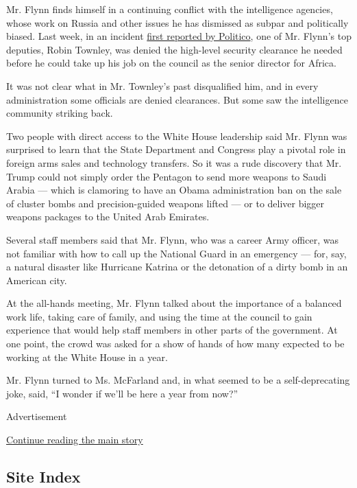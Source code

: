 Mr. Flynn finds himself in a continuing conflict with the intelligence
agencies, whose work on Russia and other issues he has dismissed as
subpar and politically biased. Last week, in an incident
\href{http://www.politico.com/story/2017/02/mike-flynn-nsa-aide-trump-234923}{first
reported by Politico}, one of Mr. Flynn's top deputies, Robin Townley,
was denied the high-level security clearance he needed before he could
take up his job on the council as the senior director for Africa.

It was not clear what in Mr. Townley's past disqualified him, and in
every administration some officials are denied clearances. But some saw
the intelligence community striking back.

Two people with direct access to the White House leadership said Mr.
Flynn was surprised to learn that the State Department and Congress play
a pivotal role in foreign arms sales and technology transfers. So it was
a rude discovery that Mr. Trump could not simply order the Pentagon to
send more weapons to Saudi Arabia --- which is clamoring to have an
Obama administration ban on the sale of cluster bombs and
precision-guided weapons lifted --- or to deliver bigger weapons
packages to the United Arab Emirates.

Several staff members said that Mr. Flynn, who was a career Army
officer, was not familiar with how to call up the National Guard in an
emergency --- for, say, a natural disaster like Hurricane Katrina or the
detonation of a dirty bomb in an American city.

At the all-hands meeting, Mr. Flynn talked about the importance of a
balanced work life, taking care of family, and using the time at the
council to gain experience that would help staff members in other parts
of the government. At one point, the crowd was asked for a show of hands
of how many expected to be working at the White House in a year.

Mr. Flynn turned to Ms. McFarland and, in what seemed to be a
self-deprecating joke, said, ``I wonder if we'll be here a year from
now?''

Advertisement

\protect\hyperlink{after-bottom}{Continue reading the main story}

\hypertarget{site-index}{%
\subsection{Site Index}\label{site-index}}

